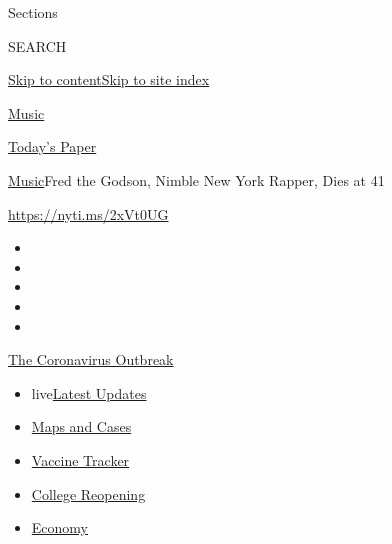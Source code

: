 Sections

SEARCH

\protect\hyperlink{site-content}{Skip to
content}\protect\hyperlink{site-index}{Skip to site index}

\href{https://www.nytimes3xbfgragh.onion/section/arts/music}{Music}

\href{https://myaccount.nytimes3xbfgragh.onion/auth/login?response_type=cookie\&client_id=vi}{}

\href{https://www.nytimes3xbfgragh.onion/section/todayspaper}{Today's
Paper}

\href{/section/arts/music}{Music}\textbar{}Fred the Godson, Nimble New
York Rapper, Dies at 41

\url{https://nyti.ms/2xVt0UG}

\begin{itemize}
\item
\item
\item
\item
\item
\end{itemize}

\href{https://www.nytimes3xbfgragh.onion/news-event/coronavirus?action=click\&pgtype=Article\&state=default\&region=TOP_BANNER\&context=storylines_menu}{The
Coronavirus Outbreak}

\begin{itemize}
\tightlist
\item
  live\href{https://www.nytimes3xbfgragh.onion/2020/08/04/world/coronavirus-covid-19.html?action=click\&pgtype=Article\&state=default\&region=TOP_BANNER\&context=storylines_menu}{Latest
  Updates}
\item
  \href{https://www.nytimes3xbfgragh.onion/interactive/2020/us/coronavirus-us-cases.html?action=click\&pgtype=Article\&state=default\&region=TOP_BANNER\&context=storylines_menu}{Maps
  and Cases}
\item
  \href{https://www.nytimes3xbfgragh.onion/interactive/2020/science/coronavirus-vaccine-tracker.html?action=click\&pgtype=Article\&state=default\&region=TOP_BANNER\&context=storylines_menu}{Vaccine
  Tracker}
\item
  \href{https://www.nytimes3xbfgragh.onion/2020/08/02/us/covid-college-reopening.html?action=click\&pgtype=Article\&state=default\&region=TOP_BANNER\&context=storylines_menu}{College
  Reopening}
\item
  \href{https://www.nytimes3xbfgragh.onion/live/2020/08/03/business/stock-market-today-coronavirus?action=click\&pgtype=Article\&state=default\&region=TOP_BANNER\&context=storylines_menu}{Economy}
\end{itemize}

